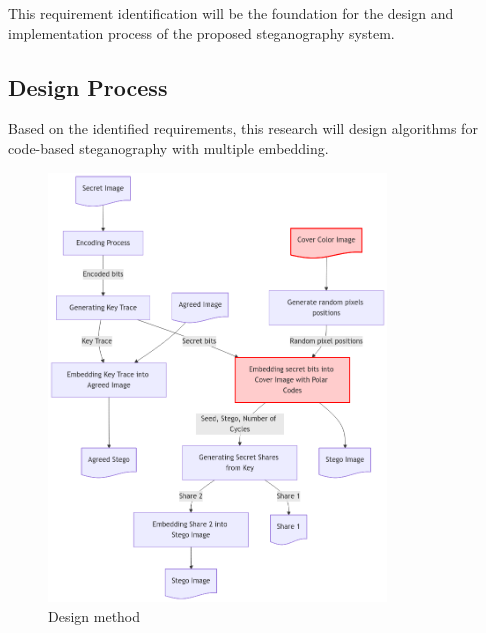 \documentclass{ittelkom}
\begin{document}
This requirement identification will be the foundation for the design and
implementation process of the proposed steganography system.

\subsection{Design Process}
Based on the identified requirements, this research will design algorithms for
code-based steganography with multiple embedding.

\begin{figure}[h]
    \centering
    \includegraphics[width=0.8\textwidth]{gambar/proposed.png}
    \caption{Design method}
    \label{fig:flow}
\end{figure}

\end{document}
